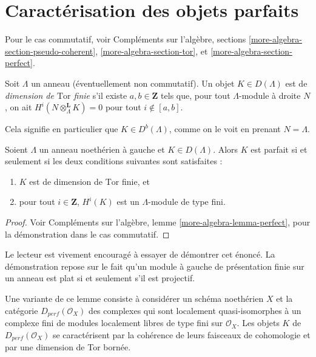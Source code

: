 \section{Caractérisation des objets parfaits}
\label{section-characterizing-perfect}

\noindent
Pour le cas commutatif, voir
Compléments sur l'algèbre, sections
\ref{more-algebra-section-pseudo-coherent},
\ref{more-algebra-section-tor}, et
\ref{more-algebra-section-perfect}.

\begin{definition}
\label{definition-finite-tor-dimension}
Soit $\Lambda$ un anneau (éventuellement non commutatif).
Un objet $K\in D(\Lambda)$ est de {\it dimension de $\text{Tor}$ finie}
s'il existe $a, b \in \mathbf{Z}$ tels que, pour tout
$\Lambda$-module à droite $N$, on ait
$H^i(N \otimes_{\Lambda}^\mathbf{L} K) = 0$ pour tout
$i \not \in [a, b]$.
\end{definition}

\noindent
Cela signifie en particulier que $K \in D^b(\Lambda)$, comme on le voit en prenant
$N = \Lambda$.

\begin{lemma}
\label{lemma-characterize-perfect}
Soient $\Lambda$ un anneau noethérien à gauche et $K\in D(\Lambda)$. Alors $K$ est
parfait si et seulement si les deux conditions suivantes sont satisfaites :
\begin{enumerate}
\item
$K$ est de dimension de $\text{Tor}$ finie, et
\item
pour tout $i \in \mathbf{Z}$, $H^i(K)$ est un $\Lambda$-module de type fini.
\end{enumerate}
\end{lemma}

\begin{proof}
Voir Compléments sur l'algèbre, lemme \ref{more-algebra-lemma-perfect},
pour la démonstration dans le cas commutatif.
\end{proof}

\noindent
Le lecteur est vivement encouragé à essayer de démontrer cet énoncé. La démonstration repose sur le
fait qu'un module à gauche de présentation finie sur un anneau est plat si et seulement
s'il est projectif.

\begin{remark}
\label{remark-variant}
Une variante de ce lemme consiste à considérer un schéma noethérien $X$
et la catégorie $D_{perf}(\mathcal{O}_X)$ des complexes qui sont localement
quasi-isomorphes à un complexe fini de modules localement libres de type fini sur
$\mathcal{O}_X$. Les objets $K$ de $D_{perf}(\mathcal{O}_X)$
se caractérisent par la cohérence de leurs faisceaux de cohomologie et par une
dimension de Tor bornée.
\end{remark}








